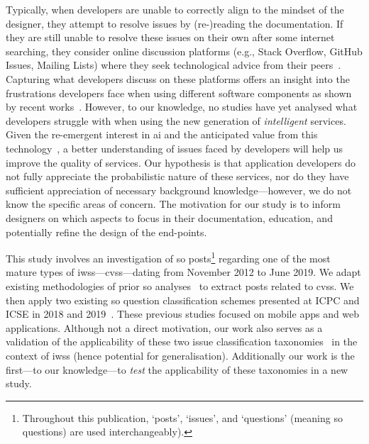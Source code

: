 Typically, when developers are unable to correctly align to the mindset of the  designer, they attempt to resolve issues by \mbox{(re-)reading} the  documentation. If they are still unable to resolve these issues on their own after some internet searching, they consider online discussion platforms (e.g., Stack Overflow, GitHub Issues, Mailing Lists) where they seek technological advice from their peers~\citep{Aghajani:2019bo}.
Capturing what developers discuss on these platforms offers an insight into the frustrations developers face when using different software components as shown by recent works~\citep{Rosen:2016uk,Beyer:2014ec,Kavaler:2013uh,Wang:2013ub,Stevens:2013vf}.
However, to our knowledge, no studies have yet analysed what developers struggle with when using the new generation of \textit{intelligent} services. Given the re-emergent interest in \gls{ai} and the anticipated value from this technology~\citep{LoGiudice:2016wf}, a better understanding of issues faced by developers will help us improve the quality of services. Our hypothesis is that application developers do not fully appreciate the probabilistic nature of these services, nor do they have sufficient appreciation of necessary background knowledge---however, we do not know the specific areas of concern. The motivation for our study is to inform  designers on which aspects to focus in their documentation, education, and potentially refine the design of the end-points.

This study involves an investigation of \NumPostsCategorised{} \gls{so} posts\footnote{Throughout this publication, `posts', `issues', and `questions' (meaning \gls{so} questions) are used interchangeably).} regarding one of the most mature types of \glspl{iws}---\glspl{cvs}---dating from November 2012 to June 2019. We adapt existing methodologies of prior \gls{so} analyses~\citep{Tahir:2018ks, Beyer:2014ec} to extract posts related to \glspl{cvs}. We then apply two existing \gls{so} question classification schemes presented at ICPC and ICSE in 2018 and 2019~\citep{Aghajani:2019bo,Beyer:2018fm}. These previous studies focused on mobile apps and web applications. Although not a direct motivation, our work also serves as a validation of the applicability of these two issue classification taxonomies~\citep{Aghajani:2019bo,Beyer:2018fm} in the context of \glspl{iws} (hence potential for generalisation). Additionally our work is the first---to our knowledge---to \textit{test} the applicability of these taxonomies in a new study.

